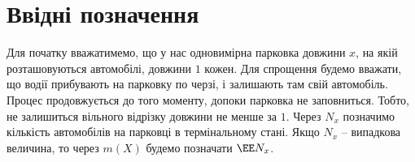 \section{Ввідні позначення}

Для початку вважатимемо, що у нас одновимірна парковка довжини $x$, на якій розташовуються автомобілі, довжини $1$ кожен.
Для спрощення будемо вважати, що водії прибувають на парковку по черзі, і залишають там свій автомобіль. Процес продовжується до того моменту, допоки парковка не заповниться. Тобто, не залишиться вільного відрізку довжини не менше за $1$.
Через $N_{x}$ позначимо кількість автомобілів на парковці в термінальному стані. Якщо $N_{x}$ – випадкова величина, то через $m(X)$ будемо позначати $\EE N_{x}$.
